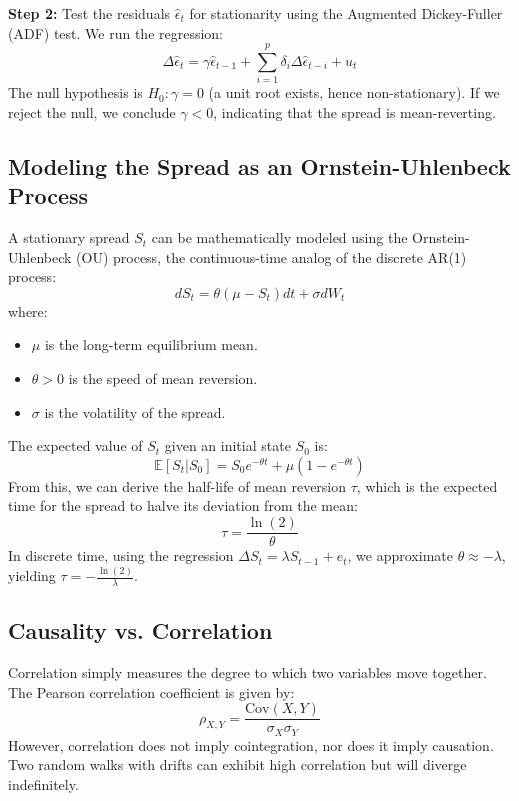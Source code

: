 \documentclass[12pt,a4paper]{article}
\begin{document}
\textbf{Step 2:} Test the residuals $\hat{\epsilon}_t$ for stationarity using the Augmented Dickey-Fuller (ADF) test. We run the regression:
\begin{equation}
    \Delta \hat{\epsilon}_t = \gamma \hat{\epsilon}_{t-1} + \sum_{i=1}^p \delta_i \Delta \hat{\epsilon}_{t-i} + u_t
\end{equation}
The null hypothesis is $H_0: \gamma = 0$ (a unit root exists, hence non-stationary). If we reject the null, we conclude $\gamma < 0$, indicating that the spread is mean-reverting.

\subsection{Modeling the Spread as an Ornstein-Uhlenbeck Process}
A stationary spread $S_t$ can be mathematically modeled using the Ornstein-Uhlenbeck (OU) process, the continuous-time analog of the discrete AR(1) process:
\begin{equation}
    dS_t = \theta (\mu - S_t) dt + \sigma dW_t
\end{equation}
where:
\begin{itemize}
    \item $\mu$ is the long-term equilibrium mean.
    \item $\theta > 0$ is the speed of mean reversion.
    \item $\sigma$ is the volatility of the spread.
\end{itemize}
The expected value of $S_t$ given an initial state $S_0$ is:
\begin{equation}
    \mathbb{E}[S_t | S_0] = S_0 e^{-\theta t} + \mu (1 - e^{-\theta t})
\end{equation}
From this, we can derive the half-life of mean reversion $\tau$, which is the expected time for the spread to halve its deviation from the mean:
\begin{equation}
    \tau = \frac{\ln(2)}{\theta}
\end{equation}
In discrete time, using the regression $\Delta S_t = \lambda S_{t-1} + e_t$, we approximate $\theta \approx -\lambda$, yielding $\tau = -\frac{\ln(2)}{\lambda}$.

\subsection{Causality vs. Correlation}
Correlation simply measures the degree to which two variables move together. The Pearson correlation coefficient is given by:
\begin{equation}
    \rho_{X,Y} = \frac{\text{Cov}(X, Y)}{\sigma_X \sigma_Y}
\end{equation}
However, correlation does not imply cointegration, nor does it imply causation. Two random walks with drifts can exhibit high correlation but will diverge indefinitely.
\end{document}
